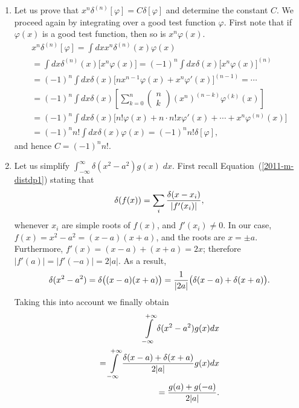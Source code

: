 {\begin{enumerate}
\item
Let us prove that
$x^n\delta^{(n)}[\varphi]=C\delta [\varphi]$    and determine the constant $C$.
We proceed again by integrating over a good test function $\varphi$.
First note that if
$\varphi (x)$ is a good test function, then so is
$x^n\varphi (x)$.
 \begin{equation}
\begin{split}
    x^n\delta^{(n)}[\varphi] =
   \int dx x^n\delta^{(n)}(x)\varphi(x) \\
   = \int dx \delta^{(n)}(x)\bigl[x^n\varphi(x)\bigr]
   =(-1)^n \int dx \delta(x)\bigl[x^n\varphi(x)\bigr]^{(n)}\\
  =(-1)^n \int dx \delta(x)\bigl[nx^{n-1}\varphi(x)+x^n\varphi'(x)
   \bigr]^{(n-1)}=
 \cdots \\
   =(-1)^n \int dx \delta(x)\left[\sum_{k=0}^n
           \left(
          \begin{array}{c}
          n\\ k
           \end{array}\right) (x^n)^{(n-k)}\varphi ^{(k)}(x)\right]
    \\
   =(-1)^n \int dx
\delta(x)\bigl[n!\varphi(x)+n\cdot n!x\varphi'(x) +
\cdots +x^n\varphi^{(n)}(x)
   \bigr] \\
   =(-1)^n n! \int dx \delta(x)\varphi(x)
   =(-1)^n n!  \delta[\varphi ]
,
\end{split}
\end{equation}
and hence  $ C=(-1)^n n!$.


\item
Let us simplify $\int_{-\infty}^\infty \delta (x^2-a^2)g(x)\; dx$.
First recall Equation~(\ref{2011-m-distdp1})  stating that
$$
   \delta(f(x))=\sum_{i}{\delta(x-x_i)\over|f'(x_i)|},
$$
whenever $x_i$ are simple roots of  $f(x)$, and $f'(x_i)\neq 0$.
In our case, $
   f(x)=x^2-a^2=(x-a)(x+a)
$, and the roots are  $x=\pm a$.
Furthermore,
$
   f'(x)=(x-a)+(x+a)= 2x
$; therefore
$
   |f'(a)|=|f'(-a)|=2|a|$.
As a result,
$$
    \delta(x^2-a^2)=\delta\bigl((x-a)(x+a)\bigr)={1\over|2a|}
   \bigl(\delta(x-a)+\delta(x+a)\bigr).
$$
Taking this into account we finally obtain
 \begin{equation}
\begin{split}
  \int\limits_{-\infty}^{+\infty}\delta(x^2-a^2)
   g(x)dx\\
  =
\int\limits_{-\infty}^{+\infty}{\delta(x-a)+\delta(x+a)\over
   2|a|}g(x)dx\\
  =    {g(a)+g(-a)\over2|a|}.
\end{split}
\end{equation}



\end{enumerate}}
